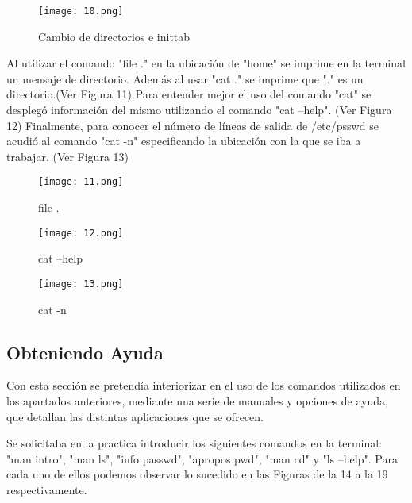 \documentclass[
  letterpaper, 
  maincolor=black,
  sectioncolor=black!90,
  subsectioncolor=black!70,
  itemtextcolor=black!40,
]{fortysecondscv}
\begin{document}
\begin{center}
    \begin{figure}[H]
    \centering
    \texttt{[image: 10.png]}
    \caption{Cambio de directorios e inittab}
    \label{fig:7.png}
    \end{figure}
\end{center}

{Al utilizar el comando "file ." en la ubicación de "home" se imprime en la terminal un mensaje de directorio. Además al usar "cat ." se imprime que "." es un directorio.(Ver Figura 11) Para entender mejor el uso del comando "cat" se desplegó información del mismo utilizando el comando "cat --help". (Ver Figura 12) Finalmente, para conocer el número de líneas de salida de /etc/psswd se acudió al comando "cat -n" especificando la ubicación con la que se iba a trabajar. (Ver Figura 13)} 

\begin{center}
    \begin{figure}[H]
    \centering
    \texttt{[image: 11.png]}
    \caption{file .}
    \label{fig:8.png}
    \end{figure}
\end{center}

\begin{center}
    \begin{figure}[H]
    \centering
    \texttt{[image: 12.png]}
    \caption{cat --help}
    \label{fig:8.png}
    \end{figure}
\end{center}

\begin{center}
    \begin{figure}[H]
    \centering
    \texttt{[image: 13.png]}
    \caption{cat -n}
    \label{fig:8.png}
    \end{figure}
\end{center}


\subsection{Obteniendo Ayuda}

{Con esta sección se pretendía interiorizar en el uso de los comandos utilizados en los apartados anteriores, mediante una serie de manuales y opciones de ayuda, que detallan las distintas aplicaciones que se ofrecen.}

{Se solicitaba en la practica introducir los siguientes comandos en la terminal: "man intro", "man ls", "info passwd", "apropos pwd", "man cd" y "ls --help". Para cada uno de ellos podemos observar lo sucedido en las Figuras de la 14 a la 19 respectivamente.}
\end{document}
